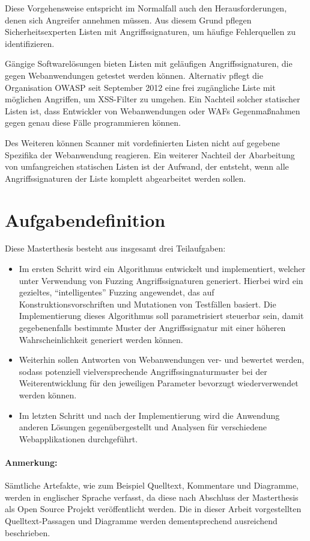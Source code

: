 Diese Vorgehensweise entspricht im Normalfall auch den Herausforderungen, denen sich Angreifer annehmen müssen. Aus diesem Grund pflegen Sicherheitsexperten Listen mit Angriffssignaturen, um häufige Fehlerquellen zu identifizieren.

Gängige Softwarelösungen bieten Listen mit geläufigen Angriffssignaturen, die gegen Webanwendungen getestet werden können. Alternativ pflegt die Organisation \ac{OWASP} seit September 2012 eine frei zugängliche Liste mit möglichen Angriffen, um \ac{XSS}-Filter zu umgehen.
Ein Nachteil solcher statischer Listen ist, dass Entwickler von Webanwendungen oder \acp{WAF} Gegenmaßnahmen gegen genau diese Fälle programmieren können.

Des Weiteren können Scanner mit vordefinierten Listen nicht auf gegebene Spezifika der Webanwendung reagieren. Ein weiterer Nachteil der Abarbeitung von umfangreichen statischen Listen ist der Aufwand, der entsteht, wenn alle Angriffssignaturen der Liste komplett abgearbeitet werden sollen.

\section{Aufgabendefinition}

Diese Masterthesis besteht aus insgesamt drei Teilaufgaben:
\begin{itemize}
	\item Im ersten Schritt wird ein Algorithmus entwickelt und implementiert, welcher unter Verwendung von Fuzzing Angriffssignaturen generiert. Hierbei wird ein gezieltes, “intelligentes” Fuzzing angewendet, das auf Konstruktionsvorschriften und Mutationen von Testfällen basiert. Die Implementierung dieses Algorithmus soll parametrisiert steuerbar sein, damit gegebenenfalls bestimmte Muster der Angriffssignatur mit einer höheren Wahrscheinlichkeit generiert werden können.
	\item Weiterhin sollen Antworten von Webanwendungen ver- und bewertet werden, sodass potenziell vielversprechende Angriffssingnaturmuster bei der Weiterentwicklung für den jeweiligen Parameter bevorzugt wiederverwendet werden können.
	\item Im letzten Schritt und nach der Implementierung wird die Anwendung anderen Lösungen gegenübergestellt und Analysen für verschiedene Webapplikationen durchgeführt.
\end{itemize}

\paragraph{Anmerkung:}
Sämtliche Artefakte, wie zum Beispiel Quelltext, Kommentare und Diagramme, werden in englischer Sprache verfasst, da diese nach Abschluss der Masterthesis als Open Source Projekt veröffentlicht werden. Die in dieser Arbeit vorgestellten Quelltext-Passagen und Diagramme werden dementsprechend ausreichend beschrieben.

